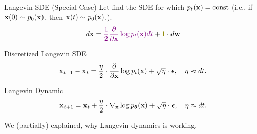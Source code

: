 \documentclass{beamer}
\begin{document}
\begin{frame}{Langevin SDE (Special Case)}
	Let find the SDE for which $p_t(\mathbf{x}) = \text{const}$ (i.e., if $\mathbf{x}(0) \sim p_0(\mathbf{x})$, then $\mathbf{x}(t) \sim p_0(\mathbf{x})$.).
	\[
		d \bx = {\color{violet}\frac{1}{2} \frac{\partial}{\partial \bx} \log p_t(\bx) d t} + {\color{olive}1} \cdot d \bw
	\]
	\eqpause
	\begin{block}{Discretized Langevin SDE}
		\vspace{-0.3cm}
		\[
			\mathbf{x}_{t + 1} - \mathbf{x}_t = \frac{\eta}{2} \cdot \frac{\partial}{\partial \mathbf{x}} \log p_t(\mathbf{x}) + \sqrt{\eta} \cdot \boldsymbol{\epsilon}, \quad \eta \approx dt.
		\]
		\vspace{-0.4cm}
	\end{block}
	\begin{block}{Langevin Dynamic}
		\vspace{-0.3cm}
		\[
			\mathbf{x}_{t + 1} = \mathbf{x}_t + \frac{\eta}{2} \cdot \nabla_{\mathbf{x}} \log p_{\boldsymbol{\theta}}(\mathbf{x}) + \sqrt{\eta} \cdot \boldsymbol{\epsilon}, \quad \eta \approx dt.
		\]
		\vspace{-0.3cm}
	\end{block}
	We (partially) explained, why Langevin dynamics is working.
\end{frame}
\end{document}
